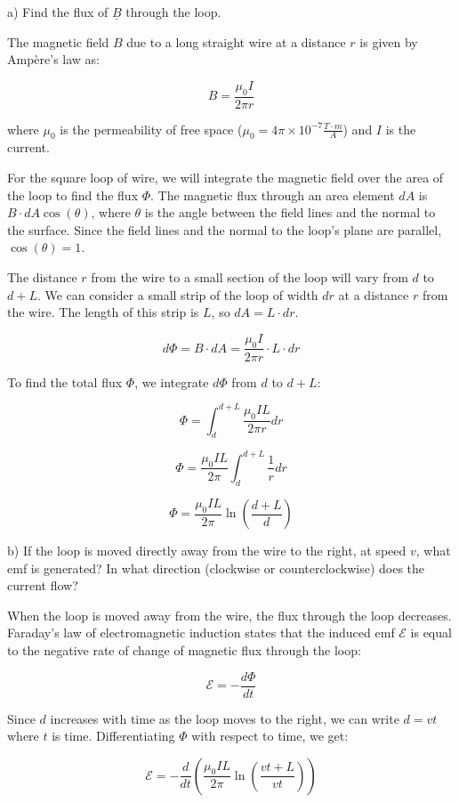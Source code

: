 \documentclass[a4paper,11pt]{article}
\begin{document}
a) Find the flux of \( \underline{B} \) through the loop.

The magnetic field \( B \) due to a long straight wire at a distance \( r \) is given by Ampère's law as:

\[
B = \frac{\mu_0 I}{2 \pi r}
\]

where \( \mu_0 \) is the permeability of free space (\( \mu_0 = 4\pi \times 10^{-7} \frac{T \cdot m}{A} \)) and \( I \) is the current.

For the square loop of wire, we will integrate the magnetic field over the area of the loop to find the flux \( \Phi \). The magnetic flux through an area element \( dA \) is \( B \cdot dA \cos(\theta) \), where \( \theta \) is the angle between the field lines and the normal to the surface. Since the field lines and the normal to the loop's plane are parallel, \( \cos(\theta) = 1 \).

The distance \( r \) from the wire to a small section of the loop will vary from \( d \) to \( d + L \). We can consider a small strip of the loop of width \( dr \) at a distance \( r \) from the wire. The length of this strip is \( L \), so \( dA = L \cdot dr \).

\[
d\Phi = B \cdot dA = \frac{\mu_0 I}{2 \pi r} \cdot L \cdot dr
\]

To find the total flux \( \Phi \), we integrate \( d\Phi \) from \( d \) to \( d + L \):

\[
\Phi = \int_{d}^{d+L} \frac{\mu_0 I L}{2 \pi r} dr
\]

\[
\Phi = \frac{\mu_0 I L}{2 \pi} \int_{d}^{d+L} \frac{1}{r} dr
\]

\[
\Phi = \frac{\mu_0 I L}{2 \pi} \ln\left(\frac{d+L}{d}\right)
\]

b) If the loop is moved directly away from the wire to the right, at speed \( v \), what emf is generated? In what direction (clockwise or counterclockwise) does the current flow?

When the loop is moved away from the wire, the flux through the loop decreases. Faraday's law of electromagnetic induction states that the induced emf \( \mathcal{E} \) is equal to the negative rate of change of magnetic flux through the loop:

\[
\mathcal{E} = -\frac{d\Phi}{dt}
\]

Since \( d \) increases with time as the loop moves to the right, we can write \( d = vt \) where \( t \) is time. Differentiating \( \Phi \) with respect to time, we get:

\[
\mathcal{E} = -\frac{d}{dt}\left(\frac{\mu_0 I L}{2 \pi} \ln\left(\frac{vt+L}{vt}\right)\right)
\]
\end{document}
